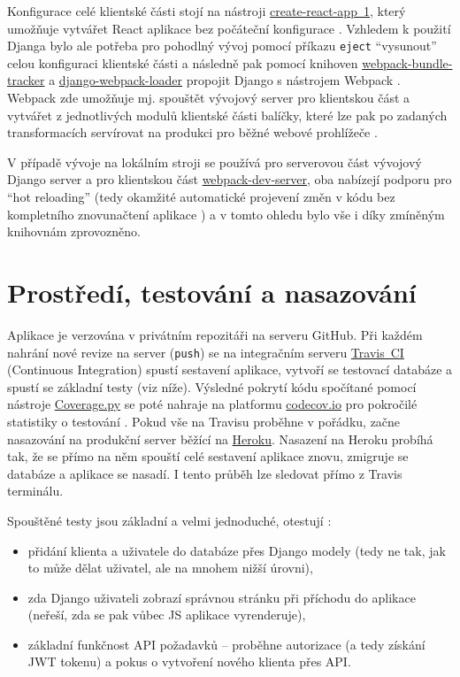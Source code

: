 Konfigurace celé klientské části stojí na nástroji \href{https://github.com/facebook/create-react-app}{create-react-app~1}, který umožňuje vytvářet React aplikace bez počáteční konfigurace \cite{cra}. Vzhledem k použití Djanga bylo ale potřeba pro pohodlný vývoj pomocí příkazu \verb|eject| \enquote{vysunout} celou konfiguraci klientské části a následně pak pomocí knihoven \href{https://github.com/owais/webpack-bundle-tracker}{webpack-bundle-tracker} a  \href{https://github.com/owais/django-webpack-loader}{django-webpack-loader} propojit Django s nástrojem Webpack \cite{bp}. Webpack zde umožňuje mj. spouštět vývojový server pro klientskou část a vytvářet z jednotlivých modulů klientské části balíčky, které lze pak po zadaných transformacích servírovat na produkci pro běžné webové prohlížeče \cite{webpack-ackee}.

V případě vývoje na lokálním stroji se používá \cite{bp} pro serverovou část vývojový Django server a pro klientskou část \href{https://github.com/webpack/webpack-dev-server}{webpack-dev-server}, oba nabízejí podporu pro \enquote{hot reloading} (tedy okamžité automatické projevení změn v kódu bez kompletního znovunačtení aplikace \cite{webpack-docs-hmr}) a v tomto ohledu bylo vše i díky zmíněným knihovnám zprovozněno.

\section{Prostředí, testování a nasazování}\label{sec:prostreditestovaninasazovani}

Aplikace \cite{bp} je verzována v privátním repozitáři na serveru GitHub. Při každém nahrání nové revize na server (\verb|push|) se na integračním serveru \href{https://travis-ci.com/}{Travis~CI} (Continuous Integration) spustí sestavení aplikace, vytvoří se testovací databáze a spustí se základní testy (viz níže). Výsledné pokrytí kódu spočítané pomocí nástroje \href{https://coverage.readthedocs.io/}{Coverage.py} se poté nahraje na platformu \href{https://codecov.io/}{codecov.io} pro pokročilé statistiky o testování \cite{codecov}. Pokud vše na Travisu proběhne v pořádku, začne nasazování na produkční server běžící na \href{https://www.heroku.com/}{Heroku}. Nasazení na Heroku probíhá tak, že se přímo na něm spouští celé sestavení aplikace znovu, zmigruje se databáze a aplikace se nasadí. I tento průběh lze sledovat přímo z Travis terminálu.

Spouštěné testy jsou základní a velmi jednoduché, otestují \cite{bp}:
\begin{itemize}
    \item přidání klienta a uživatele do databáze přes Django modely (tedy ne tak, jak to může dělat uživatel, ale na mnohem nižší úrovni),
    \item zda Django uživateli zobrazí správnou stránku při příchodu do aplikace (neřeší, zda se pak vůbec JS aplikace vyrenderuje),
    \item základní funkčnost API požadavků -- proběhne autorizace (a tedy získání JWT tokenu) a pokus o vytvoření nového klienta přes API.
\end{itemize}

